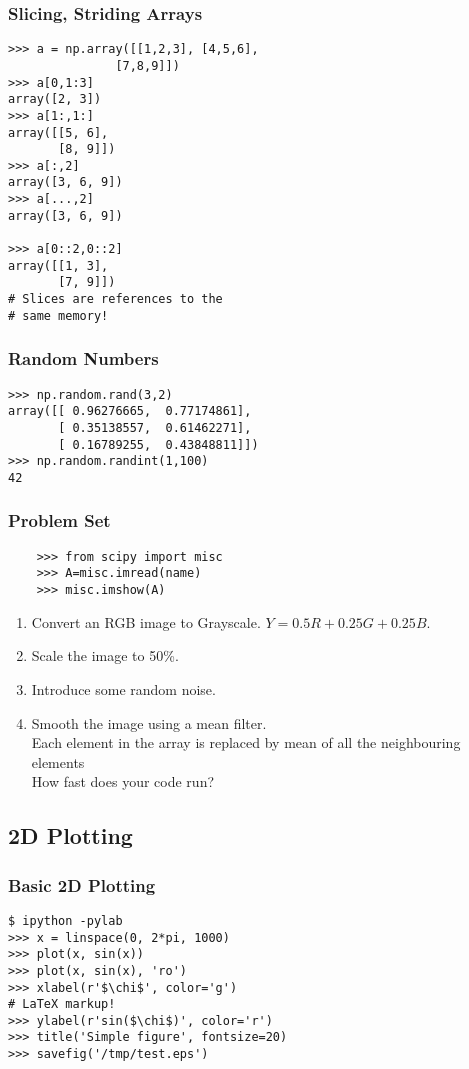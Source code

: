 \documentclass[12pt]{article}
\begin{document}
\subsubsection{Slicing, Striding Arrays}
\begin{verbatim}
>>> a = np.array([[1,2,3], [4,5,6], 
               [7,8,9]])
>>> a[0,1:3]
array([2, 3])
>>> a[1:,1:]
array([[5, 6],
       [8, 9]])
>>> a[:,2]
array([3, 6, 9])
>>> a[...,2]
array([3, 6, 9])

>>> a[0::2,0::2]
array([[1, 3],
       [7, 9]])
# Slices are references to the 
# same memory!
\end{verbatim}
\subsubsection{Random Numbers}
\begin{verbatim}
>>> np.random.rand(3,2)
array([[ 0.96276665,  0.77174861],
       [ 0.35138557,  0.61462271],
       [ 0.16789255,  0.43848811]])
>>> np.random.randint(1,100)
42
\end{verbatim}

\subsubsection{Problem Set}
\begin{verbatim}
    >>> from scipy import misc
    >>> A=misc.imread(name)
    >>> misc.imshow(A)
\end{verbatim}
\begin{enumerate}
  \item Convert an RGB image to Grayscale. $ Y = 0.5R + 0.25G + 0.25B $.
  \item Scale the image to 50\%.
  \item Introduce some random noise.
  \item Smooth the image using a mean filter.
  \\\small{Each element in the array is replaced by mean of all the neighbouring elements}
  \\\small{How fast does your code run?}
\end{enumerate}

\subsection{2D Plotting}
\subsubsection{Basic 2D Plotting}
\begin{verbatim}
$ ipython -pylab
>>> x = linspace(0, 2*pi, 1000)
>>> plot(x, sin(x)) 
>>> plot(x, sin(x), 'ro')
>>> xlabel(r'$\chi$', color='g')
# LaTeX markup!
>>> ylabel(r'sin($\chi$)', color='r')
>>> title('Simple figure', fontsize=20)
>>> savefig('/tmp/test.eps')
\end{verbatim}
\end{document}
